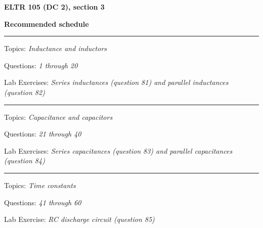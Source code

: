 
\centerline{\bf ELTR 105 (DC 2), section 3} \bigskip 
 
\vskip 10pt

\noindent
{\bf Recommended schedule}

\vskip 5pt

\hrule \vskip 5pt
\noindent
{}

\hskip 10pt Topics: {\it Inductance and inductors}
 
\hskip 10pt Questions: {\it 1 through 20}
 
\hskip 10pt Lab Exercises: {\it Series inductances (question 81) and parallel inductances (question 82)}
 


\vskip 10pt
\hrule \vskip 5pt
\noindent
{}

\hskip 10pt Topics: {\it Capacitance and capacitors}
 
\hskip 10pt Questions: {\it 21 through 40}
 
\hskip 10pt Lab Exercises: {\it Series capacitances (question 83) and parallel capacitances (question 84)}
 




\vskip 10pt
\hrule \vskip 5pt
\noindent
{}

\hskip 10pt Topics: {\it Time constants}
 
\hskip 10pt Questions: {\it 41 through 60}
 
\hskip 10pt Lab Exercise: {\it RC discharge circuit (question 85)}
 


